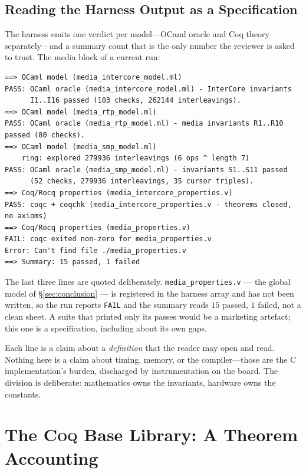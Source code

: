 \documentclass[10pt,journal,compsoc,twocolumn]{article}
\theoremstyle{definition}
\theoremstyle{remark}
\theoremstyle{plain}
\newcommand{\Coq}{\textsc{Coq}}
\newcommand{\ctr}[1]{\texttt{#1}}
\begin{document}
\subsection{Reading the Harness Output as a Specification}
The harness emits one verdict per model---OCaml oracle and Coq theory separately---and a summary count that is the only number the reviewer is asked to trust. The media block of a current run:

\begin{lstlisting}[basicstyle=\ttfamily\scriptsize]
==> OCaml model (media_intercore_model.ml)
PASS: OCaml oracle (media_intercore_model.ml) - InterCore invariants
      I1..I16 passed (103 checks, 262144 interleavings).
==> OCaml model (media_rtp_model.ml)
PASS: OCaml oracle (media_rtp_model.ml) - media invariants R1..R10 passed (80 checks).
==> OCaml model (media_smp_model.ml)
    ring: explored 279936 interleavings (6 ops ^ length 7)
PASS: OCaml oracle (media_smp_model.ml) - invariants S1..S11 passed
      (52 checks, 279936 interleavings, 35 cursor triples).
==> Coq/Rocq properties (media_intercore_properties.v)
PASS: coqc + coqchk (media_intercore_properties.v - theorems closed, no axioms)
==> Coq/Rocq properties (media_properties.v)
FAIL: coqc exited non-zero for media_properties.v
Error: Can't find file ./media_properties.v
==> Summary: 15 passed, 1 failed
\end{lstlisting}

The last three lines are quoted deliberately. \ctr{media\_properties.v} --- the global model of \S\ref{sec:conclusion} --- is registered in the harness array and has not been written, so the run reports \ctr{FAIL} and the summary reads \(15\) passed, \(1\) failed, not a clean sheet. A suite that printed only its passes would be a marketing artefact; this one is a specification, including about its own gaps.

Each line is a claim about a \emph{definition} that the reader may open and read. Nothing here is a claim about timing, memory, or the compiler---those are the C implementation's burden, discharged by instrumentation on the board. The division is deliberate: mathematics owns the invariants, hardware owns the constants.

\section{The \Coq{} Base Library: A Theorem Accounting}
\label{sec:accounting}
\end{document}
